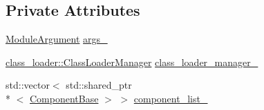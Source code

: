 \subsection*{Private Attributes}
\begin{DoxyCompactItemize}
\item 
\hyperlink{classapollo_1_1cyber_1_1mainboard_1_1ModuleArgument}{Module\-Argument} \hyperlink{classapollo_1_1cyber_1_1mainboard_1_1ModuleController_a59f9d35eda721b8cbc53e3cb3a1f0bc4}{args\-\_\-}
\item 
\hyperlink{classapollo_1_1cyber_1_1class__loader_1_1ClassLoaderManager}{class\-\_\-loader\-::\-Class\-Loader\-Manager} \hyperlink{classapollo_1_1cyber_1_1mainboard_1_1ModuleController_a2bb220ce165f65bb2caa18ee2bfacb06}{class\-\_\-loader\-\_\-manager\-\_\-}
\item 
std\-::vector$<$ std\-::shared\-\_\-ptr\\*
$<$ \hyperlink{classapollo_1_1cyber_1_1ComponentBase}{Component\-Base} $>$ $>$ \hyperlink{classapollo_1_1cyber_1_1mainboard_1_1ModuleController_a65e6f89c1acc8ba2509ed81ebe8e8b69}{component\-\_\-list\-\_\-}
\end{DoxyCompactItemize}


